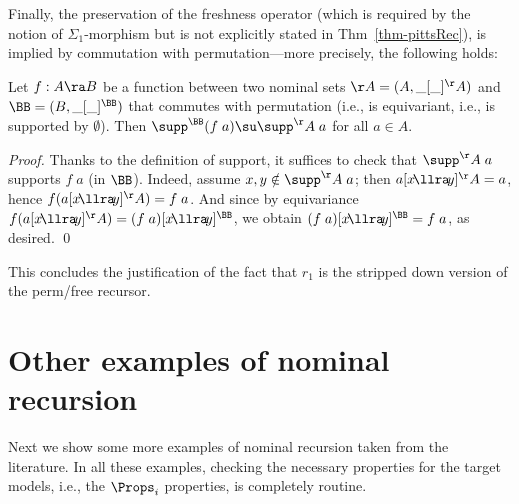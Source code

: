 %
Finally, the preservation of the freshness operator (which is required by the notion of $\Sigma_1$-morphism but is not explicitly stated in Thm~\ref{thm-pittsRec}), is implied by commutation with permutation---more precisely, the following holds:
\smallskip 
\begin{mylemma}\rm 
	\label{lem-equivImplFreshnessPres} 
	Let $f: A \ra B$ be a function between two nominal sets 
	$\AA = (A,\_[\_]^\AA)$ and $\BB = (B,\_[\_]^\BB)$ that commutes with permutation (i.e., is equivariant, i.e., is supported by $\emptyset$). Then $\supp^\BB(f\;a) \su \supp^\AA\;a$ for all $a\in A$.   
\end{mylemma}
%
\begin{proof}
Thanks to the definition of support, it suffices to check that 
$\supp^\AA\;a$ supports $f\;a$ (in $\BB$). Indeed, assume $x,y\notin \supp^\AA\;a$; then $a[x \!\llra\! y]^\AA = a$, hence $f(a[x \!\llra\! y]^\AA) = f\;a$. And since by equivariance $f(a[x \!\llra\! y]^\AA) = (f\;a)[x \!\llra\! y]^\BB$, we obtain 
 $(f\;a)[x \!\llra\! y]^\BB = f\;a$, as desired. \qed
\end{proof}

\medskip 
This concludes the justification of the fact that $r_1$ is the stripped down version of the perm/free recursor.  



\section{Other examples of nominal recursion}
\label{app-anotherExample}


Next we show some more examples of nominal recursion taken from the literature. 
In all these examples, checking the necessary properties for the target models, i.e., 
the $\Props_i$ properties, is completely routine. 


